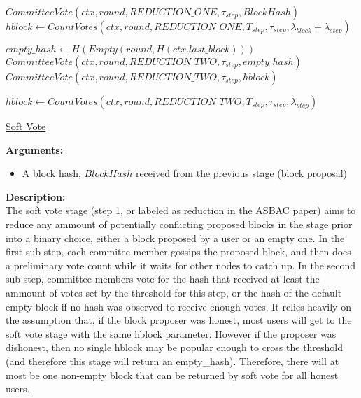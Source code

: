 \documentclass[10pt,a4paper]{article}
\begin{document}
\begin{algorithm}[H]
    \begin{algorithmic}[H]
    
    \State $CommitteeVote(ctx, round, REDUCTION\_ONE, \tau_{step}, BlockHash)$
    \State $hblock \gets CountVotes(ctx, round, REDUCTION\_ONE, T_{step}, \tau_{step}, \lambda_{block} + \lambda_{step})$

    \State $empty\_hash \gets H(Empty(round, H(ctx.last\_block)))$ 
        \State $CommitteeVote(ctx, round, REDUCTION\_TWO, \tau_{step}, empty\_hash)$
    \Else
        {\State $CommitteeVote(ctx, round, REDUCTION\_TWO, \tau_{step}, hblock)$}
    \EndIf\

    \State $hblock \gets CountVotes(ctx, round, REDUCTION\_TWO, T_{step}, \tau_{step}, \lambda_{step})$ 


    \EndFunction
    \end{algorithmic}
    \caption{\underline{Soft Vote}}
\end{algorithm}

\noindent \textbf{Arguments:}
\begin{itemize}
    \item A block hash, $BlockHash$ received from the previous stage (block proposal)
  \end{itemize}

\noindent \textbf{Description:}\\
The soft vote stage (step 1, or labeled as reduction in the ASBAC paper) aims to reduce any ammount of potentially conflicting proposed blocks in the stage prior into a binary choice, either a block proposed by a user or an empty one.
In the first sub-step, each commitee member gossips the proposed block, and then does a preliminary vote count while it waits for other nodes to catch up.
In the second sub-step, committee members vote for the hash that received at least the ammount of votes set by the threshold for this step, or the hash of the default empty block if no hash was observed to receive enough votes.
It relies heavily on the assumption that, if the block proposer was honest, most users will get to the soft vote stage with the same hblock parameter.
However if the proposer was dishonest, then no single hblock may be popular enough to cross the threshold (and therefore this stage will return an empty\_hash).
Therefore, there will at most be one non-empty block that can be returned by soft vote for all honest users.\\
\end{document}
